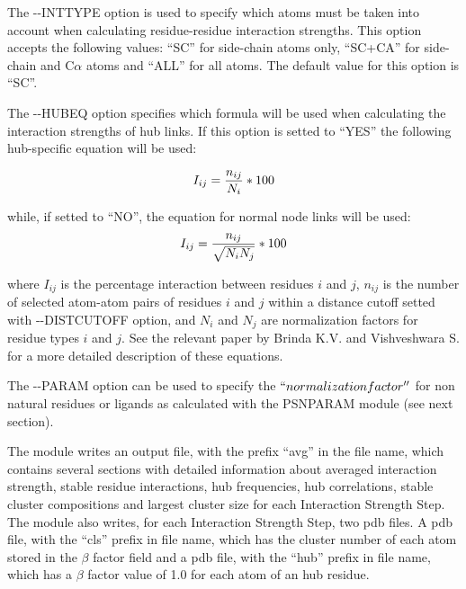 \documentclass[11pt,twoside,onecolumn,a4paper,openright,notitlepage]{book}[2001/04/21]
\begin{document}
The -{}-INTTYPE option is used to specify which atoms must be taken into account when calculating residue-residue interaction strengths.
This option accepts the following values: ``SC'' for side-chain atoms only, ``SC+CA'' for side-chain and C$\alpha{}$ atoms and ``ALL'' for all atoms. The default value for this option is ``SC''.

The -{}-HUBEQ option specifies which formula will be used when calculating the interaction strengths of hub links.
If this option is setted to ``YES'' the following hub-specific equation will be used:

\begin{equation}
I_{ij} = \frac{n_{ij}}{N_{i}}*100\\
\end{equation}

while, if setted to ``NO'', the equation for normal node links will be used:\\

\begin{equation}
I_{ij} = \frac{n_{ij}}{\sqrt{N_{i} N_{j}}}*100\\
\end{equation}

where $I_{ij}$ is the percentage interaction between residues $i$ and $j$, $n_{ij}$ is the number of selected atom-atom pairs of residues $i$ and $j$ within a distance cutoff setted with -{}-DISTCUTOFF option,
and $N_{i}$ and $N_{j}$ are normalization factors for residue types $i$ and $j$. See the relevant paper by Brinda K.V. and Vishveshwara S.\cite{brinda05} for a more detailed description of these equations.

The -{}-PARAM option can be used to specify the $``normalization factor''$ for non natural residues or ligands as calculated with the PSNPARAM module (see next section).

The module writes an output file, with the prefix ``avg'' in the file name, which contains several sections with detailed information about averaged
interaction strength, stable residue interactions, hub frequencies, hub correlations, stable cluster compositions and largest cluster size for each
Interaction Strength Step. The module also writes, for each Interaction Strength Step, two pdb files. A pdb file, with the ``cls'' prefix in file name,
which has the cluster number of each atom stored in the $\beta{}$ factor field and a pdb file, with the ``hub'' prefix in file name, which has a $\beta{}$
factor value of 1.0 for each atom of an hub residue.
\end{document}
